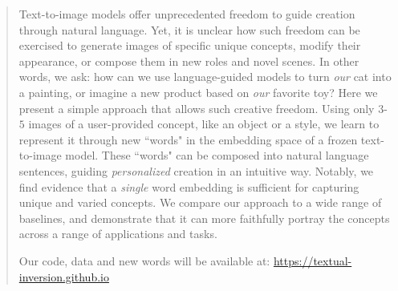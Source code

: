 \vspace{-12pt}
\begin{abstract}

Text-to-image models offer unprecedented freedom to guide creation through natural language. Yet, it is unclear how such freedom can be exercised to generate images of specific unique concepts, modify their appearance, or compose them in new roles and novel scenes.
In other words, we ask: how can we use language-guided models to turn \textit{our} cat into a painting, or imagine a new product based on \textit{our} favorite toy? 
Here we present a simple approach that allows such creative freedom. Using only $3$-$5$ images of a user-provided concept, like an object or a style, we learn to represent it through new ``words" in the embedding space of a frozen text-to-image model.
These ``words" can be composed into natural language sentences, guiding \textit{personalized} creation in an intuitive way.
Notably, we find evidence that a \textit{single} word embedding is sufficient for capturing unique and varied concepts. 
We compare our approach to a wide range of baselines, and demonstrate that it can more faithfully portray the concepts across a range of applications and tasks. 

Our code, data and new words will be available at: \url{https://textual-inversion.github.io}



\end{abstract}